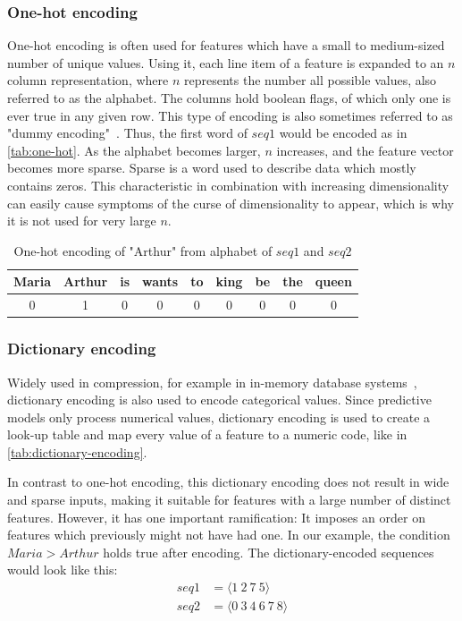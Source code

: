 \subsubsection*{One-hot encoding}
One-hot encoding is often used for features which have a small to medium-sized number of unique values. Using it, each line item of a feature is expanded to an $n$ column representation, where $n$ represents the number all possible values, also referred to as the alphabet. The columns hold boolean flags, of which only one is ever true in any given row. This type of encoding is also sometimes referred to as "dummy encoding"~\cite{web:pandas-get-dummies}. Thus, the first word of $seq1$ would be encoded as in \autoref{tab:one-hot}. As the alphabet becomes larger, $n$ increases, and the feature vector becomes more sparse. Sparse is a word used to describe data which mostly contains zeros. This characteristic in combination with increasing dimensionality can easily cause symptoms of the curse of dimensionality to appear, which is why it is not used for very large $n$.

\begin{table}[ht]
    \centering
    \begin{tabular}{c|c|c|c|c|c|c|c|c}
        Maria & Arthur & is & wants & to & king & be & the & queen\\
        \hline
        0 & 1 & 0 & 0 & 0 & 0 & 0 & 0 & 0\\
    \end{tabular}
    \caption{One-hot encoding of "Arthur" from alphabet of $seq1$ and $seq2$}
    \label{tab:one-hot}
\end{table}

\subsubsection*{Dictionary encoding}
Widely used in compression, for example in in-memory database systems~\cite{plattner2012memory}, dictionary encoding is also used to encode categorical values. Since predictive models only process numerical values, dictionary encoding is used to create a look-up table and map every value of a feature to a numeric code, like in \autoref{tab:dictionary-encoding}.

In contrast to one-hot encoding, this dictionary encoding does not result in wide and sparse inputs, making it suitable for features with a large number of distinct features. However, it has one important ramification: It imposes an order on features which previously might not have had one. In our example, the condition $Maria > Arthur$ holds true after encoding. The dictionary-encoded sequences would look like this:
\begin{equation*}
    \begin{split}
        seq1 &= \langle1\ 2\ 7\ 5\rangle\\
        seq2 &= \langle0\ 3\ 4\ 6\ 7\ 8\rangle
    \end{split}
\end{equation*}


